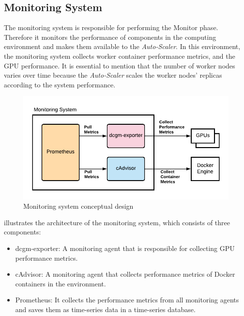 \subsection{Monitoring System}
The monitoring system is responsible for performing the Monitor phase. Therefore it monitors the performance of components in the computing environment and makes them available to the \textit{Auto-Scaler}.
In this environment, the monitoring system collects worker container performance metrics, and the GPU performance. It is essential to mention that the number of worker nodes varies over time because the \textit{Auto-Scaler} scales the worker nodes' replicas according to the system performance.
\begin{figure}[h]
\centering
\includegraphics[scale=1]{images/05_conceptual_design/autonomic_manager/monitoring_system_concept}
\caption{Monitoring system conceptual design}
\label{fig:05_am_monitoring_concept}
\end{figure}
 illustrates the architecture of the monitoring system, which consists of three components:
\begin{itemize}
\item dcgm-exporter: A monitoring agent that is responsible for collecting GPU performance metrics.

\item cAdvisor: A monitoring agent that collects performance metrics of Docker containers in the environment.

\item Prometheus: It collects the performance metrics from all monitoring agents and saves them as time-series data in a time-series database.
\end{itemize}


